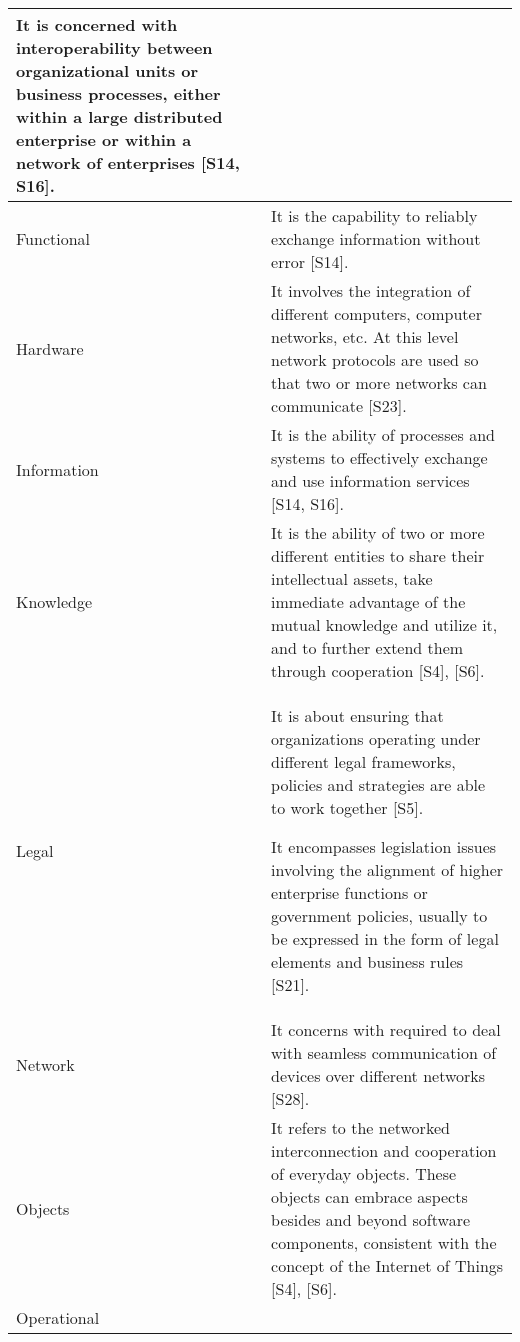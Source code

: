 \begin{longtable}{|p{2.3cm}|p{14cm}|}
    It is concerned with interoperability between organizational units or business processes, either within a large distributed enterprise or within a network of enterprises [S14, S16].
\\\hline
    Functional
    &
    It is the capability to reliably exchange information without error [S14].
\\\hline 
    Hardware
    &
    It involves the integration of different computers, computer networks, etc. At this level network protocols are used so that two or more networks can communicate [S23].
\\\hline 
    Information
    &
    It is the ability of processes and systems to effectively exchange and use information services [S14, S16].
\\\hline 
    Knowledge & It is the ability of two or more different entities to share their intellectual assets, take immediate advantage of the mutual knowledge and utilize it, and to further extend them through cooperation [S4], [S6].
\\\hline
    Legal
    &
     It is about ensuring that organizations operating under different legal frameworks, policies and strategies are able to work together [S5].
     
    It encompasses legislation issues involving the alignment of higher enterprise functions or government policies, usually to be expressed in the form of legal elements and business rules [S21].
    \\\hline 
    Network
    &
    It concerns with required to deal with seamless communication of devices over different networks [S28].
    \\\hline 
    
     Objects & 
    It refers to the networked interconnection and cooperation of everyday objects. These objects can embrace aspects besides and beyond software components, consistent with the concept of the Internet of Things [S4], [S6]. 
\\\hline
      Operational
    &
        

\end{longtable}
